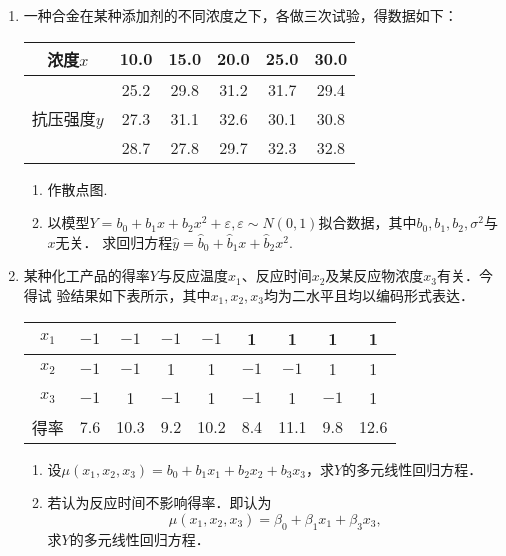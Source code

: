 \documentclass[10pt,a4paper]{article}
\begin{document}
\begin{enumerate}
    \item 一种合金在某种添加剂的不同浓度之下，各做三次试验，得数据如下：   
    \renewcommand{\arraystretch}{1.3}
    \begin{table}[H]\centering
        \begin{tabular}{c|ccccc}
        \hline
        浓度$x$                    & 10.0 & 15.0 & 20.0 & 25.0 & 30.0 \\ \hline
        \multirow{3}{*}{抗压强度$y$} & 25.2 & 29.8 & 31.2 & 31.7 & 29.4 \\ \cline{2-6} 
                                 & 27.3 & 31.1 & 32.6 & 30.1 & 30.8 \\ \cline{2-6} 
                                 & 28.7 & 27.8 & 29.7 & 32.3 & 32.8 \\ \hline
        \end{tabular}
    \end{table}
    \renewcommand{\arraystretch}{1.0}
    \begin{enumerate}
        \item 作散点图.
        \item 以模型$Y=b_0+b_1x+b_2x^2+\varepsilon,\varepsilon\sim N(0,1)$拟合数据，其中$b_0,b_1,b_2,\sigma^2$与$x$无关．
        求回归方程$\hat{y}=\hat{b}_0+\hat{b}_1x+\hat{b}_2x^2$.
    \end{enumerate}







    \item 某种化工产品的得率$Y$与反应温度$x_1$、反应时间$x_2$及某反应物浓度$x_3$有关．今得试
    验结果如下表所示，其中$x_1,x_2,x_3$均为二水平且均以编码形式表达．
    \renewcommand{\arraystretch}{1.3}
    \begin{table}[H]\centering
        \begin{tabular}{c|cccccccc}
        \hline
        $x_1$ & $-1$ & $-1$ & $-1$ & $-1$ & 1    & 1    & 1    & 1    \\ \hline
        $x_2$ & $-1$ & $-1$ & 1    & 1    & $-1$ & $-1$ & 1    & 1    \\ \hline
        $x_3$ & $-1$ & 1    & $-1$ & 1    & $-1$ & 1    & $-1$ & 1    \\ \hline
        得率    & 7.6  & 10.3 & 9.2  & 10.2 & 8.4  & 11.1 & 9.8  & 12.6 \\ \hline
        \end{tabular}
    \end{table}
    \renewcommand{\arraystretch}{1.0}
    \begin{enumerate}
        \item 设$\mu(x_1,x_2,x_3)=b_0+b_1x_1+b_2x_2+b_3x_3$，求$Y$的多元线性回归方程．
        \item 若认为反应时间不影响得率．即认为
        $$\mu(x_1,x_2,x_3)=\beta_0+\beta_1x_1+\beta_3x_3,$$
        求$Y$的多元线性回归方程．
    \end{enumerate}


    









  

\end{enumerate}
\end{document}
